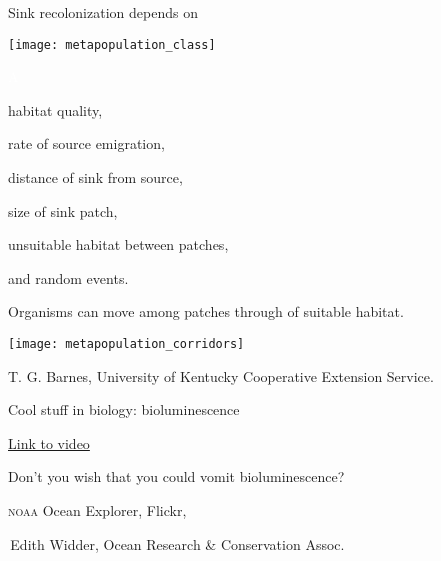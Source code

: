 \documentclass[t]{beamer}
\begin{document}
\begin{frame}[t]{Sink recolonization depends on}
	\begin{minipage}{0.5\textwidth}
		\begin{center}
			\vspace{1\baselineskip}
			\texttt{[image: metapopulation\_class]}
		\end{center}
	\end{minipage}\begin{minipage}{0.5\textwidth}
		\flushleft
		
		\hangpara \textcolor{white}{A}\vspace{-1\baselineskip}
		
		\hangpara habitat quality,\pause
		
		\hangpara rate of source emigration,\pause
		
		\hangpara distance of sink from source,\pause
		
		\hangpara size of sink patch,\pause
		
		\hangpara unsuitable habitat between patches,\pause
		
		\hangpara and random events.
		
	\end{minipage}	
\end{frame}
%
\begin{frame}[t]{Organisms can move among patches through  of suitable habitat.}

	\centering \texttt{[image: metapopulation\_corridors]}

	\vfilll
	
	\hfill \tiny \textcopyright T. G. Barnes, University of Kentucky Cooperative Extension Service.
\end{frame}
%

{
\begin{frame}[b]{\textcolor{biolum}{Cool stuff in biology: bioluminescence}}

	\tiny\textcolor{white}{\href{https://www.youtube.com/watch?v=UXl8F-eIoiM}{Link to video}}
\end{frame}
}
%
{
\begin{frame}[b]{\textcolor{biolum}{Don't you wish that you could vomit bioluminescence?}}

\hfill \tiny \textcolor{biolum}{\textsc{noaa} Ocean Explorer, Flickr, }
\end{frame}
}
%
{
\begin{frame}[b]

\tiny \textcolor{biolum}{\textcopyright\,Edith Widder, Ocean Research \& Conservation Assoc.}
\end{frame}
}

%
\end{document}
